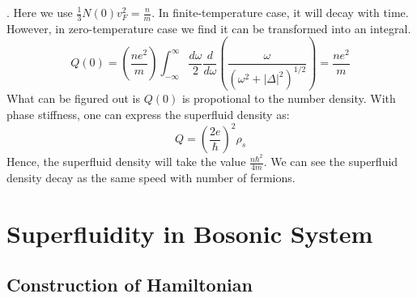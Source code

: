 \documentclass{article}
\begin{document}
. Here we use $\frac{1}{3} N (0) v_F^2 = \frac{n}{m}$. In finite-temperature
case, it will decay with time. However, in zero-temperature case we find it
can be transformed into an integral.
\begin{equation}
  Q (0) = \left( \frac{n e^2}{m} \right) \int_{- \infty}^{\infty} \frac{d
  \omega}{2} \frac{d}{d \omega} \left( \frac{\omega}{(\omega^2 + | \Delta
  |^2)^{1 / 2}} \right) = \frac{n e^2}{m}
\end{equation}
What can be figured out is $Q (0)$ is propotional to the number density. With
phase stiffness, one can express the superfluid density as:
\begin{equation}
  Q = \left( \frac{2 e}{\hbar} \right)^2 \rho_s
\end{equation}
Hence, the superfluid density will take the value $\frac{n \hbar^2}{4 m}$. We
can see the superfluid density decay as the same speed with number of
fermions.

\section{Superfluidity in Bosonic System}

\subsection{Construction of Hamiltonian}
\end{document}
